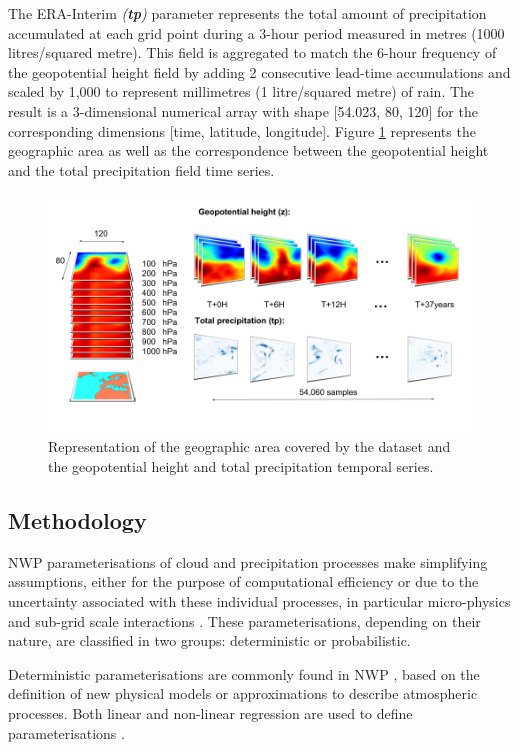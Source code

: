 \documentclass[twocol]{ametsoc}
\begin{document}
The ERA-Interim \textit{(\textbf{tp})} parameter represents the total amount of precipitation accumulated at each grid point during a 3-hour period measured in metres (1000 litres/squared metre). This field is aggregated to match the 6-hour frequency of the geopotential height field by adding 2 consecutive lead-time accumulations and scaled by 1,000 to represent millimetres (1 litre/squared metre) of rain. The result is a 3-dimensional numerical array with shape [54.023, 80, 120] for the corresponding dimensions [time, latitude, longitude]. Figure \ref{dataset} represents the geographic area as well as the correspondence between the geopotential height and the total precipitation field time series. 

\begin{figure}[h]
 \centerline{\includegraphics[width=13cm]{dataset.png}}
  \caption{Representation of the geographic area covered by the dataset and the geopotential height and total precipitation temporal series.}\label{dataset}
\end{figure}

\subsection{Methodology}

NWP parameterisations of cloud and precipitation processes make simplifying assumptions, either for the purpose of computational efficiency or due to the uncertainty associated with these individual processes, in particular micro-physics and sub-grid scale interactions \citep{lopez2007cloud}. These parameterisations, depending on their nature, are classified in two groups: deterministic or probabilistic. 

Deterministic parameterisations are commonly found in NWP \citep{kain2004kain,tiedtke1989comprehensive}, based on the definition of new physical models or approximations to describe atmospheric processes. Both linear and non-linear regression are used to define parameterisations \citep{crawford1999improved,feng20073}. 
\end{document}
